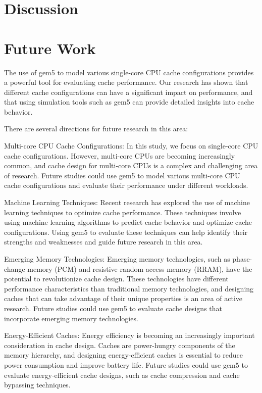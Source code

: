 \documentclass[conference]{IEEEtran}
\begin{document}
\section{Discussion}


\section{Future Work}
The use of gem5 to model various single-core CPU cache configurations provides a powerful tool for evaluating cache performance. Our research has shown that different cache configurations can have a significant impact on performance, and that using simulation tools such as gem5 can provide detailed insights into cache behavior.

There are several directions for future research in this area:

Multi-core CPU Cache Configurations: In this study, we focus on single-core CPU cache configurations. However, multi-core CPUs are becoming increasingly common, and cache design for multi-core CPUs is a complex and challenging area of research. Future studies could use gem5 to model various multi-core CPU cache configurations and evaluate their performance under different workloads.

Machine Learning Techniques: Recent research has explored the use of machine learning techniques to optimize cache performance. These techniques involve using machine learning algorithms to predict cache behavior and optimize cache configurations. Using gem5 to evaluate these techniques can help identify their strengths and weaknesses and guide future research in this area.

Emerging Memory Technologies: Emerging memory technologies, such as phase-change memory (PCM) and resistive random-access memory (RRAM), have the potential to revolutionize cache design. These technologies have different performance characteristics than traditional memory technologies, and designing caches that can take advantage of their unique properties is an area of active research. Future studies could use gem5 to evaluate cache designs that incorporate emerging memory technologies.

Energy-Efficient Caches: Energy efficiency is becoming an increasingly important consideration in cache design. Caches are power-hungry components of the memory hierarchy, and designing energy-efficient caches is essential to reduce power consumption and improve battery life. Future studies could use gem5 to evaluate energy-efficient cache designs, such as cache compression and cache bypassing techniques.
\end{document}
